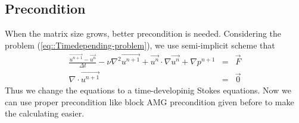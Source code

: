 \documentclass[a4paper]{article}
\begin{document}
\subsection{Precondition}
When the matrix size grows, better precondition is needed. Considering the problem (\ref{eq::Timedepending-problem}), we use semi-implicit scheme that
\begin{equation}
\begin{array}{rcl}
\frac{\vec{u^{n+1}}-\vec{u^n}}{\Delta t} - \nu \nabla^2 \vec{u^{n+1}} + \vec{u^{n}}\cdot \nabla \vec{u^n} + \nabla p^{n+1} &=& \vec{F} \\
\nabla \cdot \vec{u^{n+1}} &=& \vec{0}
\label{eq::implicit and explicit}
\end{array}
\end{equation}
Thus we change the equations to a time-developinig Stokes equations. Now we can use proper precondition like block AMG precondition given before to make the calculating easier.



\end{document}
